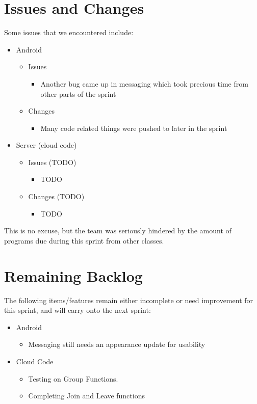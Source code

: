 \documentclass[11pt]{article}
\begin{document}
\section*{Issues and Changes}
Some issues that we encountered include:

	\begin{itemize}
		\item Android
			\begin{itemize}
				\item Issues
				\begin{itemize}
					\item Another bug came up in messaging which took precious time from other parts of the sprint
				\end{itemize}
				
				\item Changes
				\begin{itemize}
					\item Many code related things were pushed to later in the sprint
				\end{itemize}
			\end{itemize}
			
		\item Server (cloud code)
		\begin{itemize}
				\item Issues (TODO)
				\begin{itemize}
					\item TODO		
				\end{itemize}
				
				\item Changes (TODO)
				\begin{itemize}
					\item TODO
				\end{itemize}
			\end{itemize}
	\end{itemize}
	
	This is no excuse, but the team was seriously hindered by the amount of programs due during this sprint from other classes.\\

\section*{Remaining Backlog}
The following items/features remain either incomplete or need improvement for this sprint, and will carry onto the next sprint:
	\begin{itemize}
		\item Android
		\begin{itemize}
			\item Messaging still needs an appearance update for usability
		\end{itemize}
		\item Cloud Code
		\begin{itemize}
			\item Testing on Group Functions.
			\item Completing Join and Leave functions
		\end{itemize}
	\end{itemize}
\end{document}
